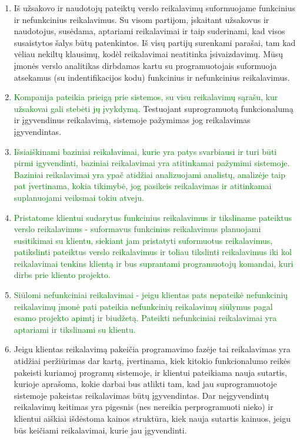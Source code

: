 \documentclass{VUMIFPSkursinis}
\begin{document}
	\begin{enumerate}
		\item{
			Iš užsakovo ir naudotojų pateiktų verslo reikalavimų suformuojame funkcinius ir nefunkcinius reikalavimus.
			Su visom partijom, įskaitant užsakovus ir naudotojus, susėdama, aptariami reikalavimai ir taip suderinami, kad visos susaistytos šalys būtų patenkintos.
			Iš visų partijų surenkami parašai, tam kad vėliau nekiltų klausimų, kodėl reikalavimai neatitinka įsivaizdavimų.
			Mūsų įmonės verslo analitikas dirbdamas kartu su programuotojais suformuoja atsekamus (su indentifikacijos kodu) funkcinius ir nefunkcinius reikalavimus.
		}
		\item{
			\textcolor{green}{Kompanija pateikia prieigą prie sistemos, su visu reikalavimų sąrašu, kur užsakovai gali stebėti jų įvykdymą.}
			Testuojant suprogramuotą funkcionalumą ir įgyvendinus reikalavimą, sistemoje pažymimas jog reikalavimas įgyvendintas.
		}
		\item{
			\textcolor{green}{Išsiaiškinami baziniai reikalavimai, kurie yra patys svarbiausi ir turi būti pirmi igyvendinti, baziniai reikalavimai yra atitinkamai pažymimi sistemoje.
			Baziniai reikalavimai yra ypač atidžiai analizuojami analistų, analizėje taip pat įvertinama, kokia tikimybė, jog pasikeis reikalavimas ir atitinkamai suplanuojami veiksmai tokiu atveju.}
		}
		\item{
				\textcolor{green}{Pristatome klientui sudarytus funkcinius reikalavimus ir tiksliname pateiktus verslo reikalavimus - suformavus funkcinius reikalavimus planuojami susitikimai su klientu, siekiant jam pristatyti suformuotus reikalavimus, patikslinti pateiktus verslo reikalavimus ir toliau tikslinti reikalavimus iki kol reikalavimai tenkins klientą ir bus suprantami programuotojų komandai, kuri dirbs prie kliento projekto.}
		}
		\item{
			\textcolor{green}{Siūlomi nefunkciniai reikalavimai - jeigu klientas pats nepateikė nefunkcinių reikalavimų įmonė pati pateikia nefunkcinių reikalavimų siūlymus pagal esamo projekto apimtį ir biudžetą.
			Pateikti nefunkciniai reikalavimai yra aptariami ir tikslinami su klientu.}
		}
		\item{
			Jeigu klientas reikalavimą pakeičia programavimo fazėje tai reikalavimas yra atidžiai peržiūrimas dar kartą, įvertinama, kiek kitokio funkcionalumo reikės pakeisti kuriamoj programų sistemoje, ir klientui pateikiama nauja sutartis, kurioje aprašoma, kokie darbai bus atlikti tam, kad jau suprogramuotoje sistemoje pakeistas reikalavimas būtų įgyvendintas.
			Dar neįgyvendintų reikalavimų keitimas yra pigesnis (nes nereikia perprogramuoti nieko) ir klientui aiškiai išdėstoma kainos struktūra, kiek nauja sutartis kainuos, jeigu būs keičiami reikalavimai, kurie jau įgyvendinti.
		}
	\end{enumerate}
\end{document}

